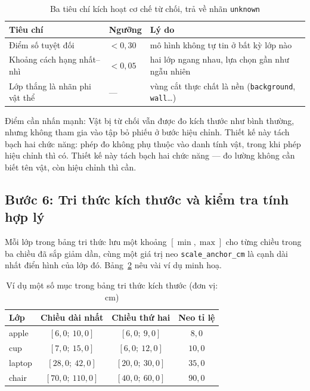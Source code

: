 \begin{table}[H]
\centering
\caption{Ba tiêu chí kích hoạt cơ chế từ chối, trả về nhãn \texttt{unknown}}
\label{tab:tu_choi}
\small
\begin{tabularx}{\textwidth}{l l X}
\toprule
\textbf{Tiêu chí} & \textbf{Ngưỡng} & \textbf{Lý do} \\
\midrule
Điểm số tuyệt đối & $< 0{,}30$
  & mô hình không tự tin ở bất kỳ lớp nào \\
Khoảng cách hạng nhất--nhì & $< 0{,}05$
  & hai lớp ngang nhau, lựa chọn gần như ngẫu nhiên \\
Lớp thắng là nhãn phi vật thể & ---
  & vùng cắt thực chất là nền (\texttt{background}, \texttt{wall}\dots) \\
\bottomrule
\end{tabularx}
\end{table}

Điểm cần nhấn mạnh: Vật bị từ chối vẫn được đo kích thước như bình thường, nhưng không tham gia vào tập bỏ phiếu ở bước hiệu chỉnh. Thiết kế này tách bạch hai chức năng: phép đo không phụ thuộc vào danh tính vật, trong khi phép hiệu chỉnh thì có. Thiết kế này tách bạch hai chức năng --- đo lường không cần biết tên
vật, còn hiệu chỉnh thì cần.

\subsection{Bước 6: Tri thức kích thước và kiểm tra tính hợp lý}

Mỗi lớp trong bảng tri thức lưu một khoảng $[\min, \max]$ cho từng chiều trong ba chiều đã sắp
giảm dần, cùng một giá trị neo \texttt{scale\_anchor\_cm} là cạnh dài nhất điển hình của lớp đó.
Bảng~\ref{tab:vidu_prior} nêu vài ví dụ minh hoạ.

\begin{table}[H]
\centering
\caption{Ví dụ một số mục trong bảng tri thức kích thước (đơn vị: cm)}
\label{tab:vidu_prior}
\small
\begin{tabular}{lccc}
\toprule
\textbf{Lớp} & \textbf{Chiều dài nhất} & \textbf{Chiều thứ hai} & \textbf{Neo tỉ lệ} \\
\midrule
apple   & $[6{,}0;\ 10{,}0]$  & $[6{,}0;\ 9{,}0]$   & $8{,}0$ \\
cup     & $[7{,}0;\ 15{,}0]$  & $[6{,}0;\ 12{,}0]$  & $10{,}0$ \\
laptop  & $[28{,}0;\ 42{,}0]$ & $[20{,}0;\ 30{,}0]$ & $35{,}0$ \\
chair   & $[70{,}0;\ 110{,}0]$& $[40{,}0;\ 60{,}0]$ & $90{,}0$ \\
\bottomrule
\end{tabular}
\end{table}

